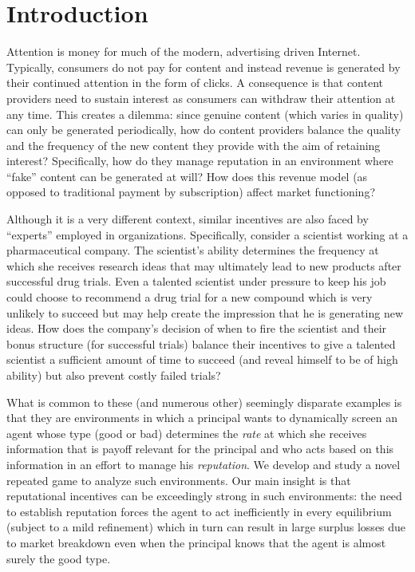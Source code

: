 \documentclass[11pt,reqno]{amsart}
\begin{document}
\maketitle

\section{Introduction}\label{sec:intro}

Attention is money for much of the modern, advertising driven Internet. Typically, consumers do not pay for content and instead revenue is generated by their continued attention in the form of clicks. A consequence is that content providers need to sustain interest as consumers can withdraw their attention at any time. This creates a dilemma: since genuine content (which varies in quality) can only be generated periodically, how do content providers balance the quality and the frequency of the new content they provide with the aim of retaining interest? Specifically, how do they manage reputation in an environment where ``fake'' content can be generated at will? How does this revenue model (as opposed to traditional payment by subscription) affect market functioning?

Although it is a very different context, similar incentives are also faced by ``experts'' employed in organizations. Specifically, consider a scientist working at a pharmaceutical company. The scientist's ability determines the frequency at which she receives research ideas that may ultimately lead to new products after successful drug trials. Even a talented scientist under pressure to keep his job could choose to recommend a drug trial for a new compound which is very unlikely to succeed but may help create the impression that he is generating new ideas. How does the company's decision of when to fire the scientist and their bonus structure (for successful trials) balance their incentives to give a talented scientist a sufficient amount of time to succeed (and reveal himself to be of high ability) but also prevent costly failed trials?

What is common to these (and numerous other) seemingly disparate examples is that they are environments in which a principal wants to dynamically screen an agent whose type (good or bad) determines the \emph{rate} at which she receives information that is payoff relevant for the principal and who acts based on this information in an effort to manage his \textit{reputation}. We develop and study a novel repeated game to analyze such environments. Our main insight is that reputational incentives can be exceedingly strong in such environments: the need to establish reputation forces the agent to act inefficiently in every equilibrium (subject to a mild refinement) which in turn can result in large surplus losses due to market breakdown even when the principal knows that the agent is almost surely the good type.
\end{document}
